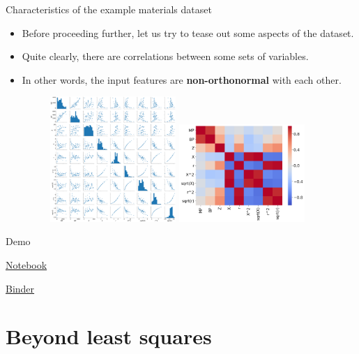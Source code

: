 \documentclass{beamer}
\begin{document}
\begin{frame}{Characteristics of the example materials dataset}
    \begin{itemize}
        \item Before proceeding further, let us try to tease out some aspects of the dataset.
        \item Quite clearly, there are correlations between some sets of variables.
        \item In other words, the input features are \textbf{non-orthonormal} with each other.
        \begin{figure}
            \centering
            \includegraphics[width=0.45\textwidth]{figures/pairplot-materialsdata.png}
            \includegraphics[width=0.45\textwidth]{figures/paircorrelations-materialsdata.png}
        \end{figure}
    \end{itemize}
\end{frame}


\begin{frame}{Demo}
    \centerline{\href{https://github.com/materialsvirtuallab/nano281/tree/master/lectures}{Notebook}}
    \centerline{\href{https://mybinder.org/v2/gh/materialsvirtuallab/nano281/master?filepath=lectures}{Binder}}
\end{frame} 


\section{Beyond least squares}
\end{document}
